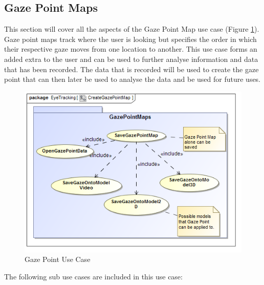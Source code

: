 \subsection{Gaze Point Maps}
	This section will cover all the aspects of the Gaze Point Map use case (Figure \ref{GazePointUseCase}). Gaze point maps track where the user is looking but specifies the order in which their respective gaze moves from one location to another. This use case forms an added extra to the user and can be used to further analyse information and data that has been recorded. The data that is recorded will be used to create the gaze point that can then later be used to analyse the data and be used for future uses.
	\newline
	\begin{figure}[!ht]
		\centering
		\includegraphics[scale=0.5]{Diagrams/Use_Case_Diagram__CreateGazePointMap.png}
		\caption{Gaze Point Use Case}
		\label{GazePointUseCase}
	\end{figure}
	

	The following sub use cases are included in this use case:
